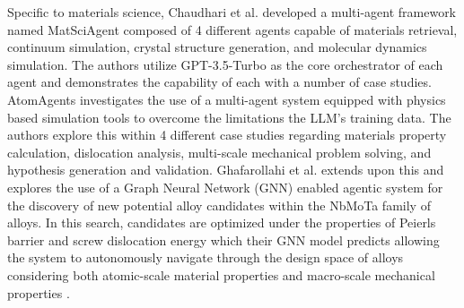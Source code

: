 Specific to materials science, Chaudhari et al. \cite{chaudhari_modular_2026}
developed a multi-agent framework named MatSciAgent composed of 4 different
agents capable of materials retrieval, continuum simulation, crystal structure
generation, and molecular dynamics simulation. The authors utilize GPT-3.5-Turbo
as the core orchestrator of each agent and demonstrates the capability of each
with a number of case studies. AtomAgents \cite{ghafarollahi_automating_2025}
investigates the use of a multi-agent system equipped with physics based
simulation tools to overcome the limitations the LLM's training data. The
authors explore this within 4 different case studies regarding materials
property calculation, dislocation analysis, multi-scale mechanical problem
solving, and hypothesis generation and validation. Ghafarollahi et al.
\cite{ghafarollahi_rapid_2025} extends upon this and explores the use of a Graph
Neural Network (GNN) enabled agentic system for the discovery of new potential
alloy candidates within the NbMoTa family of alloys. In this search, candidates
are optimized under the properties of Peierls barrier and screw dislocation
energy which their GNN model predicts allowing the system to autonomously
navigate through the design space of alloys considering both atomic-scale
material properties and macro-scale mechanical properties
\cite{ghafarollahi_rapid_2025}.


